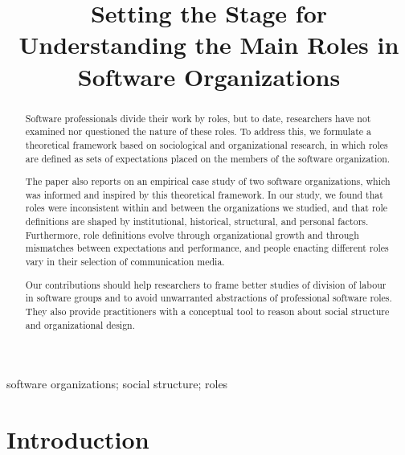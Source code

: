 \documentclass[10pt, conference, compsocconf]{IEEEtran}
\begin{document}
\title{Setting the Stage for Understanding the Main Roles in Software Organizations}

\author{
}

\maketitle


\begin{abstract}

Software professionals divide their work by roles, but to date, researchers have not examined nor questioned the nature of these roles. To address this, we formulate a theoretical framework based on sociological and organizational research, in which roles are defined as sets of expectations placed on the members of the software organization.

The paper also reports on an empirical case study of two software organizations, which was informed and inspired by this theoretical framework. In our study, we found that roles were inconsistent within and between the organizations we studied, and that role definitions are shaped by institutional, historical, structural, and personal factors. Furthermore, role definitions evolve through organizational growth and through mismatches between expectations and performance, and people enacting different roles vary in their selection of communication media.

Our contributions should help researchers to frame better studies of division of labour in software groups and to avoid unwarranted abstractions of professional software roles. They also provide practitioners with a conceptual tool to reason about social structure and organizational design.

\end{abstract}

\begin{IEEEkeywords}
software organizations; social structure; roles
\end{IEEEkeywords}


\section{Introduction}
\end{document}
